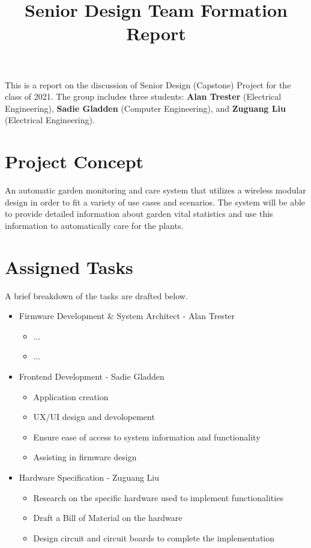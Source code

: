 \documentclass[]{article}
\title{Senior Design Team Formation Report}
\begin{document}
\maketitle

This is a report on the discussion of Senior Design (Capstone) Project for the class of 2021. The group includes three students: \textbf{Alan Trester} (Electrical Engineering), \textbf{Sadie Gladden} (Computer Engineering), and \textbf{Zuguang Liu} (Electrical Engineering).

\section{Project Concept}
An automatic garden monitoring and care system that utilizes a wireless modular design in order to fit a variety of use cases and scenarios. The system will be able to provide detailed information about garden vital statistics and use this information to automatically care for the plants.
\section{Assigned Tasks}
A brief breakdown of the tasks are drafted below.
\begin{itemize}

	\item Firmware Development \& System Architect - Alan Trester
	\begin{itemize}
		\item ...
		\item ...
	\end{itemize}

	\item Frontend Development - Sadie Gladden
	\begin{itemize}
		\item Application creation
		\item UX/UI design and devolopement 
		\item Ensure ease of access to system information and functionality
		\item Assisting in firmware design
	\end{itemize}

	\item Hardware Specification - Zuguang Liu
	\begin{itemize}
		\item Research on the specific hardware used to implement functionalities
		\item Draft a Bill of Material on the hardware
		\item Design circuit and circuit boards to complete the implementation
	\end{itemize}

\end{itemize}
\end{document}
